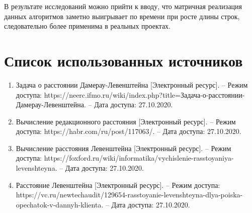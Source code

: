 \documentclass[12pt, a4paper]{report}
\begin{document}
В результате исследований можно прийти к вводу, что матричная реализация данных алгоритмов заметно выигрывает по времени при росте длины строк, следовательно более применима в реальных проектах.


\chapter*{Список использованных источников}
\begin{enumerate}
	\item Задача о расстоянии Дамерау-Левенштейна [Электронный ресурс]. – Режим доступа: https://neerc.ifmo.ru/wiki/index.php?title=Задача-о-расстоянии-Дамерау-Левенштейна. – Дата доступа: 27.10.2020.
	\item Вычисление редакционного расстояния [Электронный ресурс]. – Режим доступа: https://habr.com/ru/post/117063/. – Дата доступа: 27.10.2020.
	\item Вычисление расстояния Левенштейна [Электронный ресурс]. – Режим доступа: https://foxford.ru/wiki/informatika/vychislenie-rasstoyaniya-levenshteyna. – Дата доступа: 27.10.2020.
	\item Расстояние Левенштейна [Электронный ресурс]. – Режим доступа: https://vc.ru/newtechaudit/129654-rasstoyanie-levenshteyna-dlya-poiska-opechatok-v-dannyh-klienta. – Дата доступа: 27.10.2020.
\end{enumerate}
\end{document}
